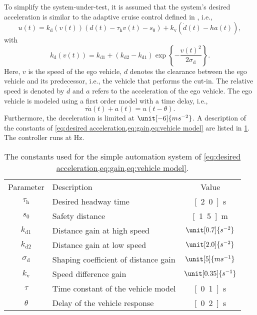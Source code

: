 To simplify the system-under-test, it is assumed that the system's desired acceleration is similar to the adaptive cruise control defined in \cite{deGelder2017assessment}, i.e.,
\begin{equation}
	\label{eq:desired acceleration} 
	u(t) = k_{\mathrm{d}}(v(t))(d(t) - \tau_{\mathrm{h}} v(t) - s_0) + k_{\mathrm{v}}\left(\dot{d}(t) - ha(t) \right),
\end{equation}
with
\begin{equation}
	\label{eq:gain}
	k_{\mathrm{d}}(v(t)) = k_{\mathrm{d1}} + \left( k_{\mathrm{d2}} - k_{\mathrm{d1}} \right) \exp \left\{ -\frac{v(t)^2}{2\sigma_{\mathrm{d}}} \right\}.
\end{equation}
Here, $v$ is the speed of the ego vehicle, $d$ denotes the clearance between the ego vehicle and its predecessor, i.e., the vehicle that performs the cut-in. The relative speed is denoted by $\dot{d}$ and $a$ refers to the acceleration of the ego vehicle. The ego vehicle is modeled using a first order model with a time delay, i.e.,
\begin{equation}
	\label{eq:vehicle model}
	\tau \dot{a}(t) + a(t) = u(t - \theta).
\end{equation}
Furthermore, the deceleration is limited at $\unit[-6]{ms^{-2}}$. A description of the constants of \cref{eq:desired acceleration,eq:gain,eq:vehicle model} are listed in \cref{tab:constants}. The controller runs at \unit[100]{Hz}.

\begin{table}
	\centering
	\caption{The constants used for the simple automation system of \cref{eq:desired acceleration,eq:gain,eq:vehicle model}.}
	\label{tab:constants}
	\begin{tabular}{clc}
		\toprule
		Parameter & Description & Value \\ \otoprule
		$\tau_{\mathrm{h}}$ & Desired headway time & \unit[2.0]{s} \\
		$s_0$ & Safety distance & \unit[1.5]{m} \\
		$k_{\mathrm{d1}}$ & Distance gain at high speed & $\unit[0.7]{s^{-2}}$ \\
		$k_{\mathrm{d2}}$ & Distance gain at low speed & $\unit[2.0]{s^{-2}}$ \\
		$\sigma_{\mathrm{d}}$ & Shaping coefficient of distance gain & $\unit[5]{ms^{-1}}$ \\
		$k_{\mathrm{v}}$ & Speed difference gain & $\unit[0.35]{s^{-1}}$ \\
		$\tau$ & Time constant of the vehicle model & \unit[0.1]{s} \\
		$\theta$ & Delay of the vehicle response & \unit[0.2]{s} \\
		\bottomrule
	\end{tabular}
\end{table}

